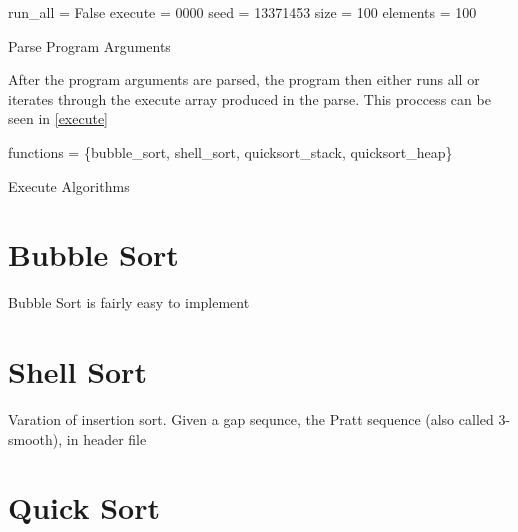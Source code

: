 \documentclass[12pt]{article}
\begin{document}
    \begin{algorithm}
        run\_all = False\;
		execute = 0000
        seed = 13371453
        size = 100
        elements = 100

        \caption{Parse Program Arguments}\label{parse}
    \end{algorithm}

    After the program arguments are parsed, the program then either runs all or iterates through the execute array produced in the parse. This proccess can be seen in \vref{execute}

    \begin{algorithm}
		functions = \{bubble\_sort, shell\_sort, quicksort\_stack, quicksort\_heap\}\;

        \caption{Execute Algorithms}\label{execute}
    \end{algorithm}

    \section{Bubble Sort}

    Bubble Sort is fairly easy to implement

    \section{Shell Sort}

    Varation of insertion sort.
    Given a gap sequnce, the Pratt sequence (also called 3-smooth), in header file
    \section{Quick Sort}
\end{document}

